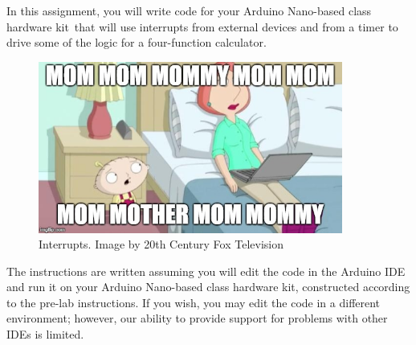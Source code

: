 

\usepackage{enumitem}
\usepackage{graphicx}
\usepackage{addfont}
\usepackage{wrapfig}

\renewcommand{\labnumber}{Group Project}
\renewcommand{\labname}{Using Interrupt-Driven Input/Output}
\renewcommand{\shortlabname}{interrupt-driven i/o -- calculatorlab}
\renewcommand{\collaborationrules}{\teameffort}
\renewcommand{\duedate}{11:59pm on\dots \\
    Wednesday Lab Section Groups: Friday, December 3 \\
    Monday Lab Section Groups: Wednesday, December 8 \\
    Tuesday Lab Section Groups: Thursday, December 9 \\
    Mixed-Section Groups: 16 calendar days after your selected start date
}
\newcommand{\nano}{Arduino Nano}
\renewcommand{\runtimeenvironment}{your \nano-based class hardware kit}

\startdocument

In this assignment, you will write code for \runtimeenvironment\ that will use
interrupts from external devices and from a timer to drive some of the logic
for a four-function calculator.

\begin{figure}[h]
    \centering
    \includegraphics[width=10cm]{MomMomMom}
    \caption{Interrupts. \tiny Image by 20th Century Fox Television}
\end{figure}

The instructions are written assuming you will edit the code in the Arduino IDE
and run it on \runtimeenvironment, constructed according to the pre-lab
instructions. If you wish, you may edit the code in a different environment;
however, our ability to provide support for problems with other IDEs is limited.

